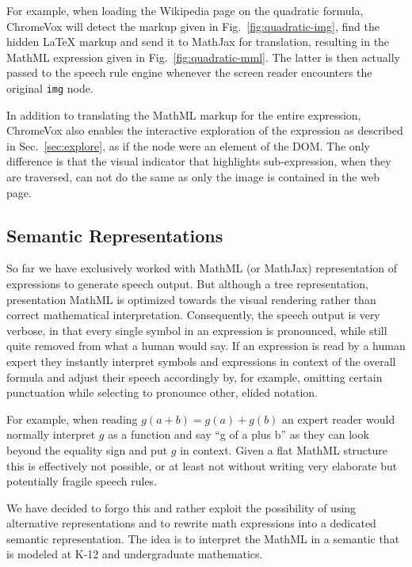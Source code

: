 \documentclass{sig-alternate}
\begin{document}
For example, when loading the Wikipedia page on the quadratic formula, ChromeVox
will detect the markup given in Fig.~\ref{fig:quadratic-img}, find the hidden
{\LaTeX} markup and send it to MathJax for translation, resulting in the MathML
expression given in Fig.~\ref{fig:quadratic-mml}. The latter is then actually
passed to the speech rule engine whenever the screen reader encounters the
original \texttt{img} node.

In addition to translating the MathML markup for the entire expression,
ChromeVox also enables the interactive exploration of the expression as
described in Sec.~\ref{sec:explore}, as if the node were an element of the
DOM. The only difference is that the visual indicator that highlights
sub-expression, when they are traversed, can not do the same as only the image is
contained in the web page.


\subsection{Semantic Representations}
\label{sec:semantic}

So far we have exclusively worked with MathML (or MathJax) representation of
expressions to generate speech output. But although a tree representation,
presentation MathML is optimized towards the visual rendering rather than
correct mathematical interpretation.  Consequently, the speech output is very
verbose, in that every single symbol in an expression is pronounced, while still
quite removed from what a human would say. If an expression is read by a human
expert they instantly interpret symbols and expressions in context of the
overall formula and adjust their speech accordingly by, for example, omitting
certain punctuation while selecting to pronounce other, elided notation.

For example, when reading $g(a+b)=g(a) + g(b)$ an expert reader would normally
interpret $g$ as a function and say ``g of a plus b'' as they can look beyond the
equality sign and put $g$ in context. Given a flat MathML structure this is
effectively not possible, or at least not without writing very elaborate but
potentially fragile speech rules.

We have decided to forgo this and rather exploit the possibility of using
alternative representations and to rewrite math expressions into a dedicated
semantic representation.  The idea is to interpret the MathML in a semantic that
is modeled at K-12 and undergraduate mathematics.
\end{document}
